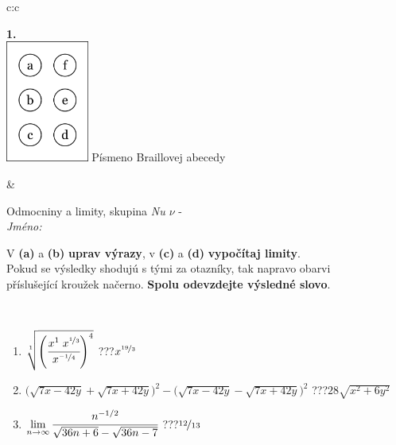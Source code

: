 \documentclass[10pt]{report}
\begin{document}
\begin{tabular}{c:c}
\begin{minipage}[c][104.5mm][t]{0.5\linewidth}
\begin{center}
\begin{minipage}{0.20\linewidth}
\begin{center}
{\Huge\bfseries 1.} \\[2mm]
\includegraphics[height=40mm]{../images/braille.png}
{\small Písmeno Braillovej abecedy}
\end{center}
\end{minipage}
\end{center}
\end{minipage}
&
\begin{minipage}[c][104.5mm][t]{0.5\linewidth}
\begin{center}
\vspace{7mm}
{\huge Odmocniny a limity, skupina \textit{Nu $\nu$} -}\\[5mm]
\textit{Jméno:}\phantom{xxxxxxxxxxxxxxxxxxxxxxxxxxxxxxxxxxxxxxxxxxxxxxxxxxxxxxxxxxxxxxxxx}\\[5mm]
\begin{minipage}{0.95\linewidth}
\begin{center}
V \textbf{(a)} a \textbf{(b)} \textbf{uprav výrazy}, v \textbf{(c)} a \textbf{(d)} \textbf{vypočítaj limity}.\\Pokud se výsledky shodujú s tými za otazníky, tak napravo obarvi\\příslušející kroužek načerno. \textbf{Spolu odevzdejte výsledné slovo}.
\end{center}
\end{minipage}
\\[1mm]
\begin{minipage}{0.79\linewidth}
\begin{center}
\begin{varwidth}{\linewidth}
\begin{enumerate}
\small
\item $\sqrt[1]{\left(\cfrac{x^{1}\;x^{\nicefrac{1}{3}}}{x^{\nicefrac{-1}{4}}}\right)^{4}}$\quad \dotfill\; ???\;\dotfill \quad $x^{\nicefrac{19}{3}}$
\item {\footnotesize{\scriptsize$\big(\sqrt{7x-42y}+\sqrt{7x+42y}\big)^2-\big(\sqrt{7x-42y}-\sqrt{7x+42y}\big)^2$}\quad \dotfill\; ???\;\dotfill \quad $28\sqrt{x^2+6y^2}$}
\item $\lim\limits_{n\to\infty}\cfrac{n^{-1/2}}{\sqrt{36n+6}-\sqrt{36n-7}}$\quad \dotfill\; ???\;\dotfill \quad $\nicefrac{12}{13}$

\end{enumerate}
\end{varwidth}
\end{center}
\end{minipage}
\end{center}
\end{minipage}
\end{tabular}
\end{document}
